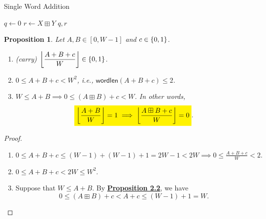 \documentclass[12pt,openany]{book}
\DeclarePairedDelimiter{\floor}{\lfloor}{\rfloor}
\newcommand{\mathcolorbox}[2]{\colorbox{#1}{$\displaystyle #2$}}
\newtheorem{proposition}[theorem]{Proposition}
\theoremstyle{definition}
\newcommand{\ie}{\textnormal{i.e.}}
\newcommand{\wordlen}{\mathsf{wordlen}}
\begin{document}
	\begin{algorithm}[H]
		\caption{Single Word Addition}
		\(q\gets 0\)\;
		\(r\gets X\boxplus Y\)
		\Return \(q,r\)\;
	\end{algorithm}
	\vspace{8pt}
	\begin{tcolorbox}[colframe=procolor,title={\color{white}\bf Single-Word Addition with Carry \(A+B+c\)}]
		\begin{proposition}
			Let \(A,B\in[0,W-1]\) and \(c\in\set{0,1}\). \begin{enumerate}[(1)]
				\item (carry) \(\displaystyle\floor*{\frac{A+B+c}{W}}\in\set{0,1}\).
				\item \(0\leq A+B+c< W^2\), \ie, \(\wordlen(A+B+c)\leq 2\).
				\item \({W\leq A+B\implies 0\leq (A\boxplus B)+c<W}\). In other words, \[
				\mathcolorbox{yellow}{\floor*{\frac{A+B}{W}}=1
				\implies\floor*{\frac{A\boxplus B+c}{W}}=0
				}.
				\]
			\end{enumerate}
		\end{proposition}
	\end{tcolorbox}
	\begin{proof}
		\begin{enumerate}[(1)]
			\item $ 0\leq A+B+c\leq (W-1)+(W-1)+1=2W-1<2W
				\implies 0\leq\frac{A+B+c}{W}<2.$
			\item \(0\leq A+B+c<2W\leq W^2\).
			\item Suppose that \(W\leq A+B\). By \hyperlink{prop2.2}{\bf Proposition 2.2}, we have \[
			0\leq (A\boxplus B)+c<A+c\leq (W-1)+1=W.
			\]
		\end{enumerate}
	\end{proof}
\end{document}
